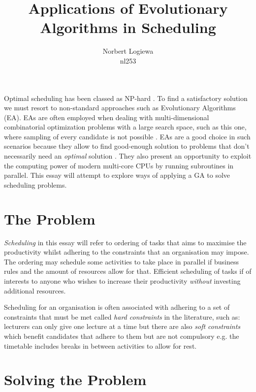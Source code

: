 \documentclass[a4paper, 12pt, titlepage]{article}
\date{} %
\author{Norbert Logiewa\\nl253}
\title{Applications of Evolutionary Algorithms in Scheduling}
\begin{document}

\maketitle

Optimal scheduling has been classed as NP-hard \cite[p.~26]{aljarrah2017}
\cite[p.~52]{diveev2017} \cite[p.~92]{mesghouni2004}.  To find a
satisfactory solution we must resort to non-standard approaches such
as Evolutionary Algorithms (EA). EAs are often employed when dealing
with multi-dimensional combinatorial optimization problems with a large
search space, such as this one, where sampling of every candidate is not
possible \cite[p.~29]{floreano2008} \cite[p.~53]{diveev2017}.  EAs are
a good choice in such scenarios because they allow to find good-enough
solution to problems that don't necessarily need an \emph{optimal}
solution\cite[p.~44]{heaton2014} \cite[p.~53]{diveev2017}.  They also
present an opportunity to exploit the computing power of modern multi-core
CPUs by running subroutines in parallel. \cite[p.~28]{aljarrah2017}
This essay will attempt to explore ways of applying a GA to solve
scheduling problems.

\section*{The Problem}

\emph{Scheduling} in this essay will refer to ordering of tasks that aims to maximise the
productivity whilst adhering to the constraints that an organisation
may impose.  The ordering may schedule some activities to take place in
parallel if business rules and the amount of resources allow for that.
Efficient scheduling of tasks if of interests to anyone who wishes to
increase their productivity \emph{without} investing additional resources.

Scheduling for an organisation is often associated with adhering to a
set of constraints that must be met called \emph{hard constraints} in
the literature, such as: lecturers can only give one lecture at a time
but there are also \emph{soft constraints} which benefit candidates that
adhere to them but are not compulsory e.g. the timetable includes breaks
in between activities to allow for rest. \cite[p.~26]{aljarrah2017}
\cite{timilsina2015} \cite[p.~2505]{qaurooni2013}

\section*{Solving the Problem}
\end{document}
